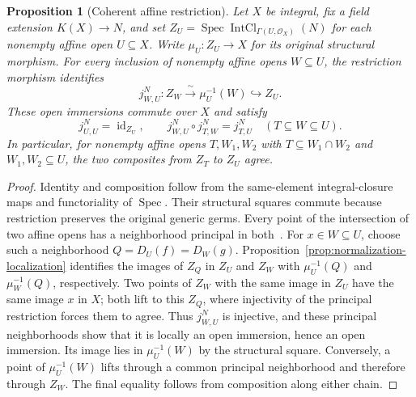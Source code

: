 \documentclass[11pt]{article}
\newtheorem{proposition}[theorem]{Proposition}
\theoremstyle{definition}
\theoremstyle{remark}
\DeclareMathOperator{\Spec}{Spec}
\begin{document}
\begin{proposition}[Coherent affine restriction]
\label{prop:normalization-affine-restriction}
Let \(X\) be integral, fix a field extension \(K(X)\to N\), and set
\(Z_U=\Spec\operatorname{IntCl}_{\Gamma(U,\mathcal O_X)}(N)\)
for each nonempty affine open \(U\subseteq X\). Write
\(\mu_U:Z_U\to X\) for its original structural morphism.
For every inclusion of nonempty affine opens \(W\subseteq U\),
the restriction morphism identifies
\[
  j^N_{W,U}:Z_W\xrightarrow{\ \sim\ }\mu_U^{-1}(W)
    \hookrightarrow Z_U.
\]
These open immersions commute over \(X\) and satisfy
\[
 j^N_{U,U}=\operatorname{id}_{Z_U},\qquad
 j^N_{W,U}\circ j^N_{T,W}=j^N_{T,U}
 \quad(T\subseteq W\subseteq U).
\]
In particular, for nonempty affine opens \(T,W_1,W_2\) with
\(T\subseteq W_1\cap W_2\) and \(W_1,W_2\subseteq U\),
the two composites from \(Z_T\) to \(Z_U\) agree.
\end{proposition}

\begin{proof}
Identity and composition follow from the same-element integral-closure
maps and functoriality of \(\Spec\). Their structural squares commute
because restriction preserves the original generic germs.
Every point of the intersection of two affine opens has a neighborhood
principal in both~\cite{StacksCommonPrincipalNeighborhood}.
For \(x\in W\subseteq U\), choose such a neighborhood
\(Q=D_U(f)=D_W(g)\). Proposition~\ref{prop:normalization-localization}
identifies the images of \(Z_Q\) in \(Z_U\) and \(Z_W\) with
\(\mu_U^{-1}(Q)\) and \(\mu_W^{-1}(Q)\), respectively.
Two points of \(Z_W\) with the same image in \(Z_U\) have the
same image \(x\) in \(X\); both lift to this \(Z_Q\), where
injectivity of the principal restriction forces them to agree.
Thus \(j^N_{W,U}\) is injective, and these principal neighborhoods
show that it is locally an open immersion, hence an open immersion.
Its image lies in \(\mu_U^{-1}(W)\) by the structural square.
Conversely, a point of \(\mu_U^{-1}(W)\) lifts through a common
principal neighborhood and therefore through \(Z_W\).
The final equality follows from composition along either chain.
\end{proof}
\end{document}
